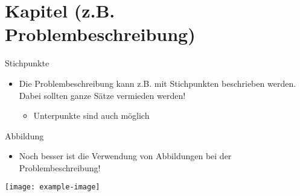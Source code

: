 \section{Kapitel (z.B. Problembeschreibung)}

\begin{frame}{Stichpunkte}
    \begin{itemize}
        \item Die Problembeschreibung kann z.B. mit Stichpunkten beschrieben werden. Dabei sollten ganze Sätze vermieden werden!
        \begin{itemize}
            \item Unterpunkte sind auch möglich
        \end{itemize}
    \end{itemize}
\end{frame}

\begin{frame}{Abbildung}
    \begin{itemize}
        \item Noch besser ist die Verwendung von Abbildungen bei der Problembeschreibung!
    \end{itemize}
    \centering
    \texttt{[image: example-image]}
\end{frame}

